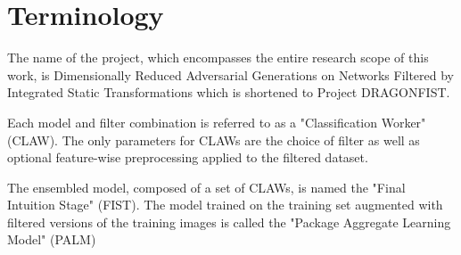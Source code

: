 \section{Terminology} \label{s:terminology}
The name of the project, which encompasses the entire research scope of this work, is \“Dimensionally Reduced Adversarial Generations on Networks Filtered by Integrated Static Transformations\” which is shortened to Project DRAGONFIST.

Each model and filter combination is referred to as a "Classification Worker" (CLAW). The only parameters for CLAWs are the choice of filter as well as optional feature-wise preprocessing applied to the filtered dataset.

The ensembled model, composed of a set of CLAWs, is named the "Final Intuition Stage" (FIST). The model trained on the training set augmented with filtered versions of the training images is called the "Package Aggregate Learning Model" (PALM)